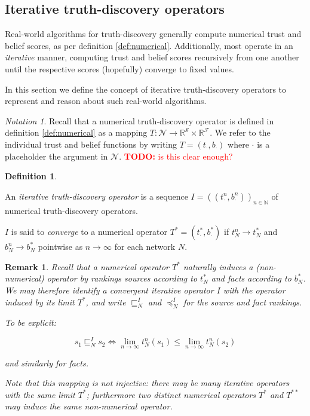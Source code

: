 \documentclass{article}
\theoremstyle{definition} \newtheorem{definition}{Definition}
\theoremstyle{definition} \newtheorem{example}{Example}
\theoremstyle{plain} \newtheorem{axiom}{Axiom}
\theoremstyle{plain} \newtheorem*{remark}{Remark}
\theoremstyle{remark} \newtheorem*{notation}{Notation}
\theoremstyle{plain} \newtheorem{lemma}{Lemma}
\theoremstyle{plain} \newtheorem{theorem}{Theorem}
\theoremstyle{plain} \newtheorem{proposition}{Proposition}
\newcommand{\todo}[1] {
    \textcolor{red}{
        \textbf{TODO:} #1
    }
}
\renewcommand{\S}{\mathcal{S}}  %
\newcommand{\F}{\mathcal{F}}
\newcommand{\N}{\mathcal{N}}
\newcommand{\R}{\mathbb{R}}
\newcommand{\Nat}{\mathbb{N}}
\newcommand{\sle}{\sqsubseteq}
\newcommand{\fle}{\preceq}
\newcommand{\pl}{\cdot}  %
\begin{document}
\subsection{Iterative truth-discovery operators}

Real-world algorithms for truth-discovery generally compute numerical trust and
belief scores, as per definition \ref{def:numerical}. Additionally, most
operate in an \emph{iterative} manner, computing trust and belief scores
recursively from one another until the respective scores (hopefully) converge
to fixed values.

In this section we define the concept of iterative truth-discovery operators to
represent and reason about such real-world algorithms.

\begin{notation}
Recall that a numerical truth-discovery operator is defined in definition
\ref{def:numerical} as a mapping $T: \N \rightarrow \R^\S \times \R^\F$. We
refer to the individual trust and belief functions by writing $T=(t_\pl,
b_\pl)$ where $\pl$ is a placeholder the argument in $\N$. \todo{is this
clear enough?}
\end{notation}

\begin{definition}
\label{def:iterative_operator}

An \emph{iterative truth-discovery operator} is a sequence $I=((t_\pl^n,
b_\pl^n))_{n \in \Nat}$ of numerical truth-discovery operators.

$I$ is said to \emph{converge} to a numerical operator $T^*=(t_\pl^*, b_\pl^*)$
if $t_N^n \rightarrow t_N^*$ and $b_N^n \rightarrow b_N^*$ pointwise as $n
\rightarrow \infty$ for each network $N$.

\end{definition}

\begin{remark}
Recall that a numerical operator $T^*$ naturally induces a (non-numerical)
operator by rankings sources according to $t_N^*$ and facts according to
$b_N^*$. We may therefore identify a convergent iterative operator $I$ with the
operator induced by its limit $T^*$, and write $\sle_N^I$ and $\fle_N^I$ for
the source and fact rankings.

To be explicit:

$$ s_1 \sle_N^I s_2 \iff \lim_{n \rightarrow \infty}{t_N^n(s_1)} \le \lim_{n
\rightarrow \infty}{t_N^n(s_2)} $$

and similarly for facts.

Note that this mapping is not injective: there may be many iterative operators
with the same limit $T^*$; furthermore two distinct numerical operators $T^*$
and $T^{**}$ may induce the same non-numerical operator.
\end{remark}
\end{document}
